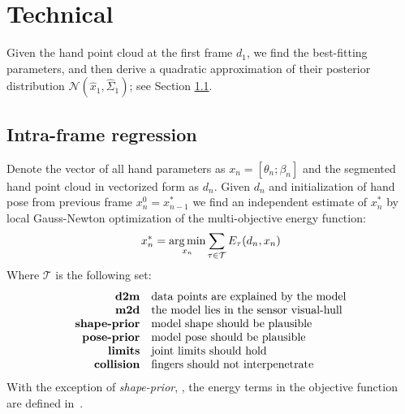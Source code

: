 \section{Technical}
Given the hand point cloud at the first frame $d_1$, we find the best-fitting parameters, and then derive a quadratic approximation of their posterior distribution $\mathcal{N}(\hat x_1, \hat \Sigma_1)$; see Section \ref{sec:independent-solve}.

\subsection{Intra-frame regression }
\label{sec:independent-solve}
% 
Denote the vector of all hand parameters as $x_n = [\theta_n; \beta_n]$ and the segmented hand point cloud in vectorized form as $d_n$. Given $d_n$ and initialization of hand pose from previous frame $x_n^0 = x_{n - 1}^*$ we find an independent estimate of $x_n^*$ by local Gauss-Newton optimization of the multi-objective energy function:
% 
\begin{equation}
x_n^* = \operatorname*{arg\,min}_{x_n} \sum_{\tau \in \mathcal{T}} E_{\tau}(d_n, x_n) \label{eq:energies}
\end{equation}
% 
Where $\mathcal{T}$ is the following set:
%
\vspace{-.5\parskip}
\begin{equation*}
\setlength{\jot}{0pt}
\begin{aligned}
\text{\textbf{d2m}} & \quad \text{data points are explained by the model} \\ 
\text{\textbf{m2d}} & \quad \text{the model lies in the sensor visual-hull} \\
\text{\textbf{shape-prior}} & \quad \text{model shape should be plausible} \\
\text{\textbf{pose-prior}} & \quad \text{model pose should be plausible} \\
\text{\textbf{limits}} & \quad \text{joint limits should hold} \\
\text{\textbf{collision}} & \quad \text{fingers should not interpenetrate} 
\end{aligned}
\end{equation*}
With the exception of \emph{shape-prior}, , the energy terms in the objective function are defined in~\cite{tkach2016sphere}.

